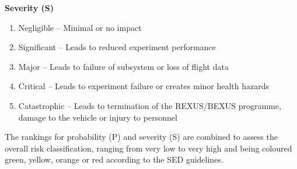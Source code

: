 \documentclass[a4paper,12pt,twoside]{article}
\begin{document}
\textbf{Severity (S)}
\begin{enumerate}
    \item Negligible – Minimal or no impact 
    \item Significant – Leads to reduced experiment performance 
    \item Major – Leads to failure of subsystem or loss of flight data 
    \item Critical – Leads to experiment failure or creates minor health hazards 
    \item Catastrophic – Leads to termination of the REXUS/BEXUS programme, damage to the vehicle or injury to personnel 
\end{enumerate}

The rankings for probability (P) and severity (S) are combined to assess the overall risk classification, ranging from very low to very high and being coloured green, yellow, orange or red according to the SED guidelines.
\end{document}
